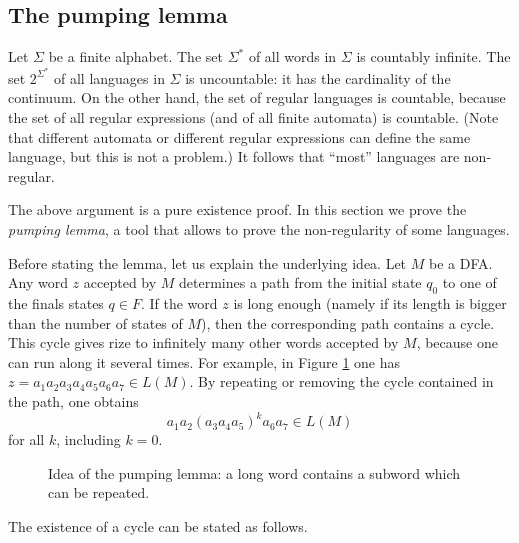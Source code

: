 \subsection{The pumping lemma}
Let $\Sigma$ be a finite alphabet.
The set $\Sigma^*$ of all words in $\Sigma$ is countably infinite.
The set $2^{\Sigma^*}$ of all languages in $\Sigma$ is uncountable: it has the cardinality of the continuum.
On the other hand, the set of regular languages is countable, because the set of all regular expressions (and of all finite automata) is countable.
(Note that different automata or different regular expressions can define the same language, but this is not a problem.)
It follows that ``most'' languages are non-regular.

The above argument is a pure existence proof.
In this section we prove the \emph{pumping lemma}, a tool that allows to prove the non-regularity of some languages.

Before stating the lemma, let us explain the underlying idea.
Let $M$ be a DFA.
Any word $z$ accepted by $M$ determines a path from the initial state $q_0$ to one of the finals states $q \in F$.
If the word $z$ is long enough (namely if its length is bigger than the number of states of $M$),
then the corresponding path contains a cycle.
This cycle gives rize to infinitely many other words accepted by $M$, because one can run along it several times.
For example, in Figure \ref{fig:LongWord} one has $z = a_1a_2a_3a_4a_5a_6a_7 \in L(M)$.
By repeating or removing the cycle contained in the path, one obtains
\[
a_1a_2(a_3a_4a_5)^ka_6a_7 \in L(M)
\]
for all $k$, including $k = 0$.

\begin{figure}[ht]
\begin{center}

\end{center}
\caption{Idea of the pumping lemma: a long word contains a subword which can be repeated.}
\label{fig:LongWord}
\end{figure}

The existence of a cycle can be stated as follows.
